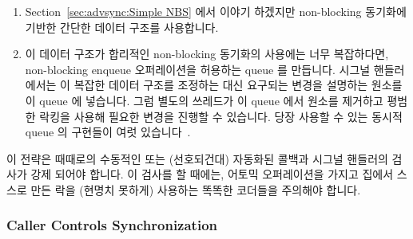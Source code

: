 \begin{enumerate}
\item	Section~\ref{sec:advsync:Simple NBS} 에서 이야기 하겠지만 non-blocking
	동기화에 기반한 간단한 데이터 구조를 사용합니다.
\item	이 데이터 구조가 합리적인 non-blocking 동기화의 사용에는 너무
	복잡하다면, non-blocking enqueue 오퍼레이션을 허용하는 queue 를
	만듭니다.
	시그널 핸들러에서는 이 복잡한 데이터 구조를 조정하는 대신 요구되는
	변경을 설명하는 원소를 이 queue 에 넣습니다.
	그럼 별도의 쓰레드가 이 queue 에서 원소를 제거하고 평범한 락킹을 사용해
	필요한 변경을 진행할 수 있습니다.
	당장 사용할 수 있는 동시적 queue 의 구현들이 여럿
	있습니다~\cite{ChristophMKirsch2012FIFOisntTR,MathieuDesnoyers2009URCU,MichaelScott96}.

\end{enumerate}

이 전략은 때때로의 수동적인 또는 (선호되건대) 자동화된 콜백과 시그널 핸들러의
검사가 강제 되어야 합니다.
이 검사를 할 때에는, 어토믹 오퍼레이션을 가지고 집에서 스스로 만든 락을 (현명치
못하게) 사용하는 똑똑한 코더들을 주의해야 합니다.

\subsubsection{Caller Controls Synchronization}
\label{sec:locking:Caller Controls Synchronization}

